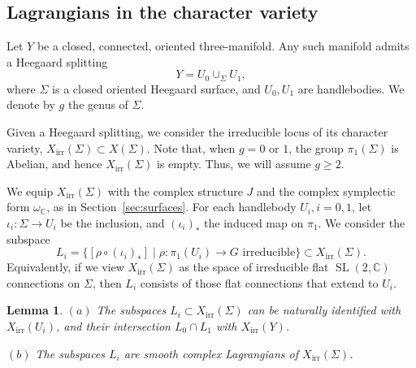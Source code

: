 \documentclass [11pt]{amsart}
\newtheorem {lemma}[theorem]{Lemma}
\theoremstyle{remark}
\def\cc {{\mathbb{C}}}
\def\C{\cc}
\def\sl {{\operatorname{SL}(2, \cc)}}
\def\Char {X}
\def\CharIrr {\Char_{\operatorname{irr}}}
\def\omegac{\omega_{\C}}
\begin{document}
\subsection{Lagrangians in the character variety}
\label{sec:Lags}
Let $Y$ be a closed, connected, oriented three-manifold. Any such manifold admits a Heegaard splitting
$$ Y = U_0 \cup_{\Sigma} U_1,$$
where $\Sigma$ is a closed oriented Heegaard surface, and $U_0, U_1$ are handlebodies. We denote by $g$ the genus of $\Sigma$. 

Given a Heegaard splitting, we consider the irreducible locus of its character variety, $\CharIrr(\Sigma) \subset \Char(\Sigma)$. Note that, when $g=0$ or $1$, the group $\pi_1(\Sigma)$ is Abelian, and hence $\CharIrr(\Sigma)$ is empty. Thus, we will assume $g \geq 2$.

We equip $\CharIrr(\Sigma)$ with the complex structure $J$ and the complex symplectic form $\omegac$, as in Section~\ref{sec:surfaces}. For each handlebody $U_i, i=0,1$, let $\iota_i :\Sigma \to U_i$ be the inclusion, and $(\iota_i)_*$ the induced map on $\pi_1$. We consider the subspace 
$$L_i =\{ [\rho \circ (\iota_i)_*] \mid \rho: \pi_1(U_i) \to G \text{ irreducible} \}  \subset \CharIrr(\Sigma).$$
Equivalently, if we view $\CharIrr(\Sigma)$ as the space of irreducible flat $\sl$ connections on $\Sigma$, then $L_i$ consists of those flat connections that extend to $U_i$.

\begin{lemma}
\label{lem:idab}
$(a)$ The subspaces $L_i \subset \CharIrr(\Sigma)$ can be naturally identified with $\CharIrr(U_i)$, and their intersection $L_0 \cap L_1$ with $\CharIrr(Y)$.

$(b)$ The subspaces $L_i$ are smooth complex Lagrangians of $\CharIrr(\Sigma)$. 
\end{lemma}
\end{document}
